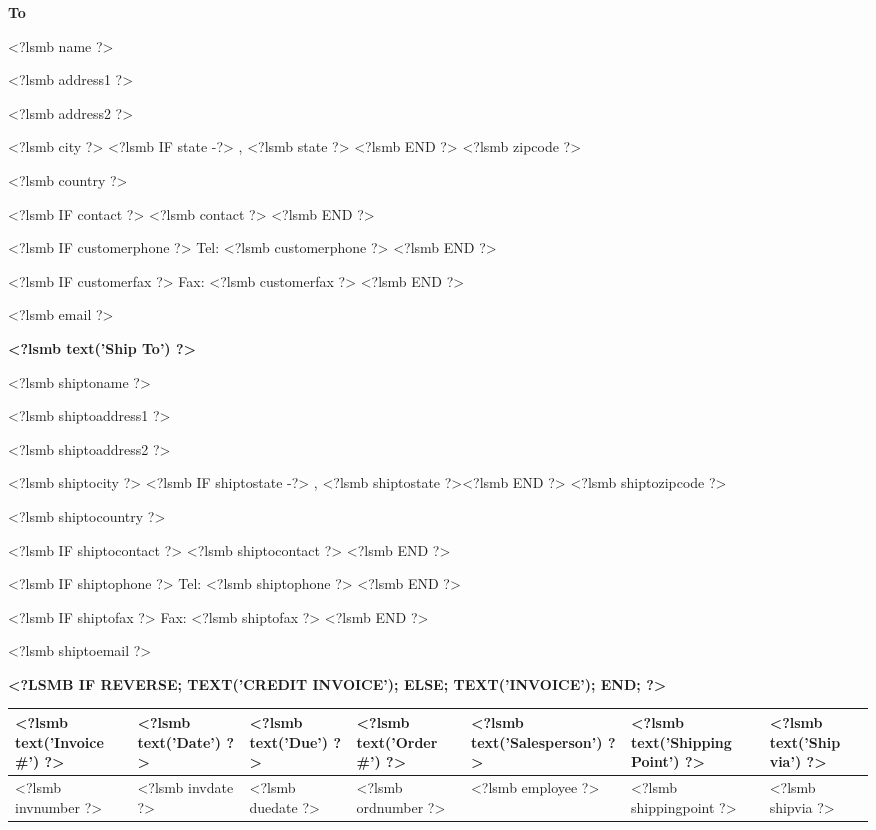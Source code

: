 \documentclass{scrartcl}
\begin{document}
\parbox[t]{.5\textwidth}{
\textbf{To}
\vspace{0.3cm}

<?lsmb name ?>

<?lsmb address1 ?>

<?lsmb address2 ?>

<?lsmb city ?>
<?lsmb IF state -?>
\hspace{-0.1cm}, <?lsmb state ?> <?lsmb END ?> <?lsmb zipcode ?>

<?lsmb country ?>

\vspace{0.3cm}

<?lsmb IF contact ?>
<?lsmb contact ?>
\vspace{0.2cm}
<?lsmb END ?>

<?lsmb IF customerphone ?>
Tel: <?lsmb customerphone ?>
<?lsmb END ?>

<?lsmb IF customerfax ?>
Fax: <?lsmb customerfax ?>
<?lsmb END ?>

<?lsmb email ?>
}
\parbox[t]{.5\textwidth}{
\textbf{<?lsmb text('Ship To') ?>}
\vspace{0.3cm}

<?lsmb shiptoname ?>

<?lsmb shiptoaddress1 ?>

<?lsmb shiptoaddress2 ?>

<?lsmb shiptocity ?>
<?lsmb IF shiptostate -?>
\hspace{-0.1cm}, <?lsmb shiptostate ?><?lsmb END ?> <?lsmb shiptozipcode ?>

<?lsmb shiptocountry ?>

\vspace{0.3cm}

<?lsmb IF shiptocontact ?>
<?lsmb shiptocontact ?>
\vspace{0.2cm}
<?lsmb END ?>

<?lsmb IF shiptophone ?>
Tel: <?lsmb shiptophone ?>
<?lsmb END ?>

<?lsmb IF shiptofax ?>
Fax: <?lsmb shiptofax ?>
<?lsmb END ?>

<?lsmb shiptoemail ?>
}
\hfill

\vspace{1cm}

\textbf{\MakeUppercase{<?lsmb
    IF reverse;
       text('Credit Invoice');
    ELSE;
       text('Invoice');
    END; ?>}}
\hfill

\vspace{1cm}

\begin{tabularx}{\textwidth}{*{7}{|X}|} \hline
  \textbf{<?lsmb text('Invoice #') ?>} & \textbf{<?lsmb text('Date') ?>} 
      & \textbf{<?lsmb text('Due') ?>} & \textbf{<?lsmb text('Order #') ?>}
      & \textbf{<?lsmb text('Salesperson') ?>} 
      & \textbf{<?lsmb text('Shipping Point') ?>} 
      & \textbf{<?lsmb text('Ship via') ?>} \\ [0.5em]
  \hline
  <?lsmb invnumber ?> & <?lsmb invdate ?> & <?lsmb duedate ?> & <?lsmb ordnumber ?> & <?lsmb employee ?>
  & <?lsmb shippingpoint ?> & <?lsmb shipvia ?> \\
  \hline
\end{tabularx}
\end{document}
